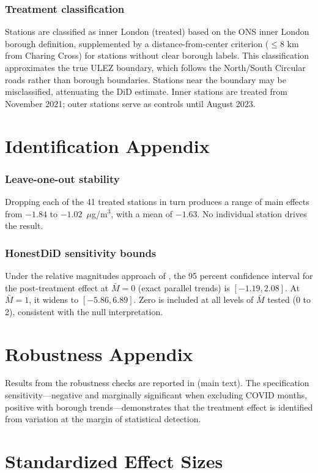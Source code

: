 \documentclass[12pt]{article}
\begin{document}
\subsubsection*{Treatment classification} Stations are classified as inner London (treated) based on the ONS inner London borough definition, supplemented by a distance-from-center criterion ($\leq$8 km from Charing Cross) for stations without clear borough labels. This classification approximates the true ULEZ boundary, which follows the North/South Circular roads rather than borough boundaries. Stations near the boundary may be misclassified, attenuating the DiD estimate. Inner stations are treated from November 2021; outer stations serve as controls until August 2023.


\section{Identification Appendix}

\subsubsection*{Leave-one-out stability} Dropping each of the 41 treated stations in turn produces a range of main effects from $-1.84$ to $-1.02$~$\mu$g/m$^3$, with a mean of $-1.63$. No individual station drives the result.

\subsubsection*{HonestDiD sensitivity bounds} Under the relative magnitudes approach of \citet{rambachanRoth2023}, the 95 percent confidence interval for the post-treatment effect at $\bar{M} = 0$ (exact parallel trends) is $[-1.19, 2.08]$. At $\bar{M} = 1$, it widens to $[-5.86, 6.89]$. Zero is included at all levels of $\bar{M}$ tested (0 to 2), consistent with the null interpretation.


\section{Robustness Appendix}

Results from the robustness checks are reported in  (main text). The specification sensitivity---negative and marginally significant when excluding COVID months, positive with borough trends---demonstrates that the treatment effect is identified from variation at the margin of statistical detection.


\section{Standardized Effect Sizes}
\label{sec:sde}


\end{document}
